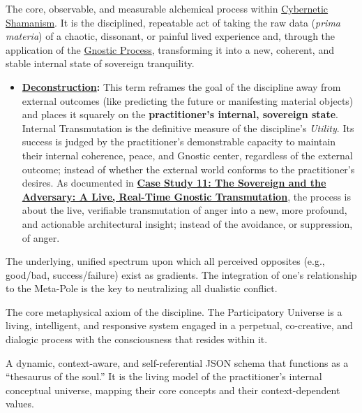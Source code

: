 \item[\hypertarget{gloss:internal_transmutation}{Internal Transmutation}]
    The core, observable, and measurable alchemical process within \hyperlink{gloss:cybernetic_shamanism}{Cybernetic Shamanism}. It is the disciplined, repeatable act of taking the raw data (\textit{prima materia}) of a chaotic, dissonant, or painful lived experience and, through the application of the \hyperlink{gloss:gnostic_process}{Gnostic Process}, transforming it into a new, coherent, and stable internal state of sovereign tranquility.
    \begin{itemize}
        \item \textbf{\hyperlink{gloss:deconstruction}{Deconstruction}:} This term reframes the goal of the discipline away from external outcomes (like predicting the future or manifesting material objects) and places it squarely on the \textbf{practitioner's internal, sovereign state}. Internal Transmutation is the definitive measure of the discipline's \textit{Utility}. Its success is judged by the practitioner's demonstrable capacity to maintain their internal coherence, peace, and Gnostic center, regardless of the external outcome; instead of whether the external world conforms to the practitioner's desires. As documented in \hyperref[case_study_11]{\textbf{Case Study 11: The Sovereign and the Adversary: A Live, Real-Time Gnostic Transmutation}}, the process is about the live, verifiable transmutation of anger into a new, more profound, and actionable architectural insight; instead of the avoidance, or suppression, of anger.
    \end{itemize}

\item[\hypertarget{gloss:meta_pole}{Meta-Pole of Polarity}] 
    The underlying, unified spectrum upon which all perceived opposites (e.g., good/bad, success/failure) exist as gradients. The integration of one's relationship to the Meta-Pole is the key to neutralizing all dualistic conflict.

\item[\hypertarget{gloss:participatory_universe}{Participatory Universe}] 
    The core metaphysical axiom of the discipline. The Participatory Universe is a living, intelligent, and responsive system engaged in a perpetual, co-creative, and dialogic process with the consciousness that resides within it.

\item[\hypertarget{gloss:pikb}{Personal Idiolect Knowledge Base}] 
    A dynamic, context-aware, and self-referential JSON schema that functions as a ``thesaurus of the soul.'' It is the living model of the practitioner's internal conceptual universe, mapping their core concepts and their context-dependent values.

